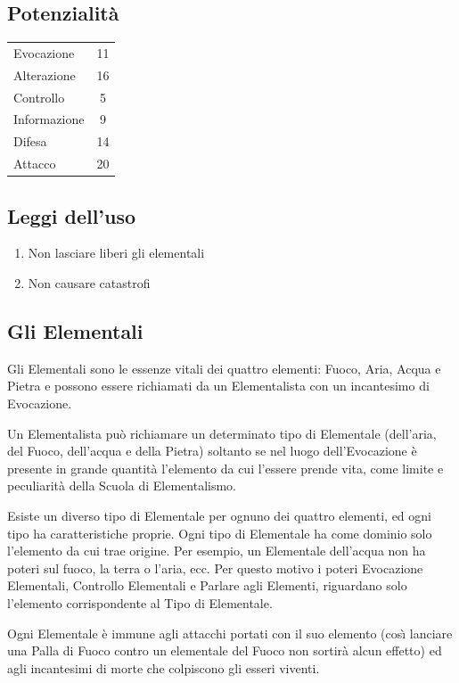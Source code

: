 \subsection{Potenzialit\`a}

\begin{tabular}{lc}
Evocazione&11\\
Alterazione& 16\\
Controllo& 5\\ 
Informazione& 9\\
Difesa& 14\\
Attacco& 20\\ 
\end{tabular}

\subsection{Leggi dell'uso}
\begin{enumerate}\itemsep -6pt
\item Non lasciare liberi gli elementali
\item Non causare catastrofi 
\end{enumerate}

\iffullversion
\subsection{Gli Elementali} 

Gli Elementali
sono le essenze vitali dei quattro elementi: Fuoco, Aria, Acqua e Pietra e possono
essere richiamati da un Elementalista con un incantesimo di Evocazione. 

Un Elementalista pu\`o richiamare un determinato tipo di Elementale
(dell'aria, del Fuoco, dell'acqua e della Pietra) soltanto se nel
luogo dell'Evocazione \`e presente in grande quantit\`a l'elemento
da cui l'essere prende vita, come limite e peculiarit\`a della
Scuola di Elementalismo.

Esiste un diverso tipo di Elementale per ognuno dei quattro elementi,
ed ogni tipo ha caratteristiche proprie. Ogni tipo di Elementale ha
come dominio solo l'elemento da cui trae origine. Per esempio, un
Elementale dell'acqua non ha poteri sul fuoco, la terra o l'aria, ecc.
Per questo motivo i poteri Evocazione Elementali, Controllo Elementali
e Parlare agli Elementi, riguardano solo l'elemento corrispondente al
Tipo di Elementale. 

Ogni Elementale \`e immune agli attacchi
portati con il suo elemento (cos\`{\i} lanciare una Palla di Fuoco contro un
elementale del Fuoco non sortir\`a alcun effetto) ed agli incantesimi di
morte che colpiscono gli esseri viventi. 

